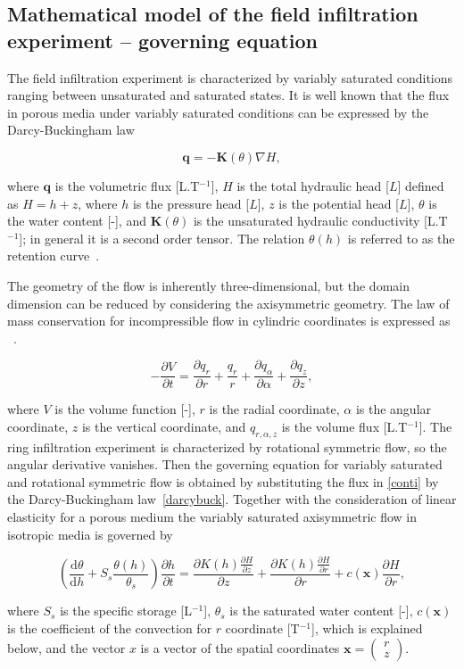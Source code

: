 \documentclass[review]{elsarticle}
\newenvironment{lineq}
    {\begin{linenomath*}
    \begin{equation}
    }
    { 
    \end{equation} 
    \end{linenomath*}
    }
\newcommand{\dd}{\mathrm{d}}
\renewcommand{\vec}{\mathbf}
\begin{document}
\subsection{Mathematical model of the field infiltration experiment -- governing equation}%
\label{goveq}


The field infiltration experiment is characterized by variably saturated conditions ranging between unsaturated and saturated states. It is well known that the flux in porous media under variably saturated conditions can be expressed by the Darcy-Buckingham law~\citep{buckingham} \begin{lineq}\label{darcybuck}\vec{q} = -\mathbf{K}(\theta) \nabla H,\end{lineq} where $\vec{q}$ is the volumetric flux [L.T$^{-1}$], $H$ is the total hydraulic head [$L$] defined as $H=h+z$, where $h$ is the pressure head [$L$], $z$ is the potential head [$L$], $\theta$ is the water content [-], and $\mathbf{K}(\theta)$ is the unsaturated hydraulic conductivity  [L.T$^{-1}$]; in general it is a  second order tensor. The relation $\theta(h)$ is referred to as the retention curve~\citep{vangenuchten}.

The geometry of the flow is inherently three-dimensional, but the domain dimension can be reduced by considering the axisymmetric geometry. The law of mass conservation  for incompressible flow in cylindric coordinates is expressed as ~\citep{bear1979}.
\begin{lineq}
\label{conti}
-\frac{\partial V}{\partial t} = \frac{\partial q_r}{\partial r} + \frac{q_r}{r} + \frac{\partial q_{\alpha}}{\partial \alpha} + \frac{\partial q_z}{\partial z} ,
\end{lineq}
where $V$ is the volume function [-],  $r$ is the radial coordinate, $\alpha$ is the angular coordinate,  $z$ is the vertical coordinate, and $q_{r, \alpha, z}$ is the  volume flux [L.T$^{-1}$]. The ring infiltration experiment is characterized by rotational symmetric flow, so the angular derivative vanishes. Then the governing equation for  variably saturated and rotational symmetric flow is obtained by substituting the flux in \eqref{conti} by the Darcy-Buckingham law~\eqref{darcybuck}. Together with the consideration of linear elasticity for a porous medium the variably saturated axisymmetric flow in isotropic media is governed by
\begin{lineq}
\label{richaxi}
\left(\frac{\dd \theta}{\dd h} + S_s\frac{\theta(h)}{\theta_s} \right) \frac{\partial h}{\partial t}  =  \frac{\partial K(h) \frac{\partial H}{\partial z}}{\partial z} + \frac{\partial K(h) \frac{\partial H}{\partial r}}{\partial r} + c(\vec{x})\frac{\partial H}{\partial r},
\end{lineq}
where $S_s$ is the specific storage [L$^{-1}$], $\theta_s$ is the saturated water content [-],  $c(\vec{x})$ is the coefficient of the convection for $r$ coordinate [T$^{-1}$], which is explained below, and the vector $x$ is a vector of the spatial coordinates $\vec{x}=\left( \begin{smallmatrix} r \\ z \end{smallmatrix} \right)$.
\end{document}
